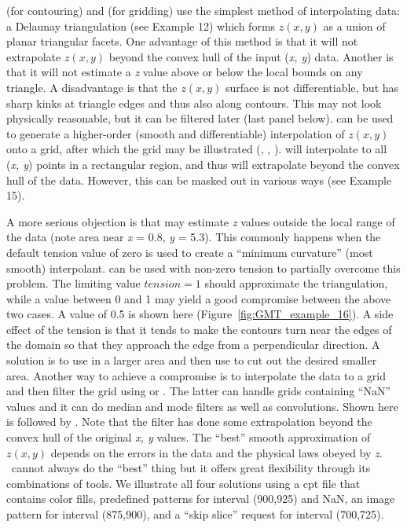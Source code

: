  (for contouring) and 
(for gridding) use the simplest method of interpolating
data:  a Delaunay triangulation (see Example 12) which
forms $z(x, y)$ as a union of planar triangular facets.
One advantage of this method is that it will not extrapolate
$z(x, y)$ beyond the convex hull of the input ({\it x, y})
data.  Another is that it will not estimate a {\it z} value
above or below the local bounds on any triangle.
A disadvantage is that the $z(x, y)$ surface is not
differentiable, but has sharp kinks at triangle edges and
thus also along contours.  This may not look physically
reasonable, but it can be filtered later (last panel below).
 can be used to generate a higher-order
(smooth and differentiable) interpolation of $z(x, y)$ onto
a grid, after which the grid may be illustrated (,
, ).   will interpolate
to all ({\it x, y}) points in a rectangular region, and thus
will extrapolate beyond the convex hull of the data.  However,
this can be masked out in various ways (see Example 15).

A more serious objection is that  may estimate
{\it z} values outside the local range of the data (note area
near {\it x} = 0.8, {\it y} = 5.3).  This commonly happens when
the default tension value of zero is used to create a ``minimum
curvature'' (most smooth) interpolant.   can be
used with non-zero tension to partially  overcome this problem.
The limiting value $tension = 1$ should approximate the triangulation,
while a value between 0 and 1 may yield a good compromise between
the above two cases.  A value of 0.5 is shown here
(Figure~\ref{fig:GMT_example_16}).  A side
effect of the tension is that it tends to make the contours turn
near the edges of the domain so that they approach the edge from
a perpendicular direction.  A solution is to use 
in a larger area and then use  to cut out the desired
smaller area.  Another way to achieve a compromise is to
interpolate the data to a grid and then filter the grid using
 or .  The latter can handle grids
containing ``NaN'' values and it can do  median and mode filters
as well as convolutions.  Shown here is  followed
by .  Note that the filter has done some
extrapolation beyond the convex hull of the original {\it x, y}
values.  The ``best'' smooth approximation of $z(x, y)$ depends
on the errors in the data and the physical laws obeyed by {\it z}.
\GMT\ cannot always do the ``best'' thing but it offers great
flexibility through its combinations of tools.  We illustrate all
four solutions using a cpt file that contains color fills,
predefined patterns for interval (900,925) and NaN, an image pattern for interval (875,900),
and a ``skip slice'' request for interval (700,725).

